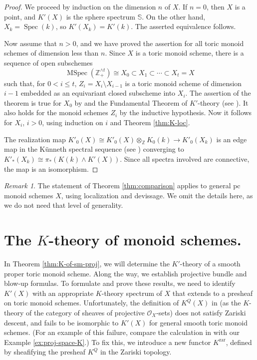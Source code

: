 \documentclass[12pt]{amsart}
\def\Kzar{K^{\mathrm{zar}}}
\def\KQ{K^Q}
\newcommand{\Z}{\mathbb{Z}}
\def\Spec{\operatorname{Spec}}
\def\MSpec{\operatorname{MSpec}}
\numberwithin{equation}{section}
\theoremstyle{plain}
\theoremstyle{definition}
\theoremstyle{remark}
\newtheorem{rem}[equation]{Remark}
\begin{document}
\begin{proof}
  We proceed by induction on the dimension $n$ of $X$.
  If $n = 0$, then $X$ is a point, and $K'(X)$ is the
  sphere spectrum $\mathbb{S}$. On the other hand,
  $X_k = \Spec (k)$, so $K'(X_k) = K'(k)$.
  The asserted equivalence follows. 
	
  Now assume that $n > 0$, and we have proved the assertion for all
  toric monoid schemes of dimension less than $n$. Since $X$ is a
  toric monoid scheme, there is a sequence of open subschemes 
\[
\MSpec(\Z_+^{\wedge t}) \cong X_0 \subset X_1 \subset \dotsm \subset X_t = X
\]
such that, for $0 < i\leq t$, $Z_i = X_i \setminus X_{i-1}$ is a toric
monoid scheme of dimension $i-1$ embedded as an equivariant closed
subscheme into $X_i$. The assertion of the theorem is true for $X_0$
by \cite[Thm.\,4.6]{HW} and the Fundamental Theorem of $K'$-theory
(see \cite[Section 6, Thm.\,8]{Quillen}). It also holds for the monoid
schemes $Z_i$ by the inductive hypothesis. Now it follows for $X_i$,
$i > 0$, using induction on $i$ and Theorem \ref{thm:K-loc}.
	
	The realization map $K'_0(X)\cong K'_0(X)\otimes_\Z K_0(k)\to K'_0(X_k)$ is an edge map in the K\"unneth spectral
	sequence (see \cite{Adams69}) converging to $K'_*(X_k)\cong \pi_*\left(K(k)\wedge K' (X)\right)$. Since all spectra involved are connective, the map is an isomorphism.
\end{proof}

\begin{rem}\label{rem:higher-comparison}
The statement of Theorem \ref{thm:comparison} applies
to general pc monoid schemes $X$, using localization and devissage.
We omit the details here, as we do not need that level of generality. 
\end{rem}

\section{The $K$-theory of monoid schemes.}\label{sec:Kzar}

In Theorem \ref{thm:K-of-sm-proj}, we will determine the $K'$-theory
of a smooth proper toric monoid scheme. Along the way, we establish
projective bundle and blow-up formulas. To formulate and prove these
results, we need to identify $K'(X)$ with an appropriate $K$-theory
spectrum of $X$ that extends to a presheaf on toric monoid
schemes. Unfortunately, the definition of $\KQ(X)$ in \cite{ELY} (as
the $K$-theory of the category of sheaves of projective
$\mathcal{O}_X$-sets) does not satisfy Zariski descent, and fails to
be isomorphic to $K'(X)$ for general smooth toric monoid schemes. (For
an example of this failure, compare the calculation in \cite[Ex
  3.20]{ELY} with our Example \ref{ex:proj-space-K}.) To fix this, we
introduce a new functor $\Kzar$, defined by sheafifying the presheaf
$\KQ$ in the Zariski topology.
\end{document}

